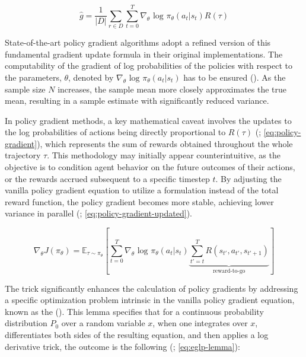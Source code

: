         \begin{equation}
            \hat{g} = \frac{1}{|D|} \sum_{r \in D} \sum_{t=0}^{T} \nabla_{\theta} \text{ log } \pi_{\theta}(a_t | s_t) R(\tau)
            \label{eq:policy-gradient-sample}
        \end{equation}
        
        \noindent State-of-the-art policy gradient algorithms adopt a refined version of this fundamental gradient update formula in their original implementations. The computability of the gradient of log probabilities of the policies with respect to the parameters, $\theta$, denoted by $\nabla_{\theta} \text{ log } \pi_{\theta}(a_t | s_t)$ has to be ensured (\textcolor{deepblue}{\cite{SpinningUp2018}}). As the sample size $N$ increases, the sample mean more closely approximates the true mean, resulting in a sample estimate with significantly reduced variance.
        
        \bigskip
        
        
        \noindent In policy gradient methods, a key mathematical caveat involves the updates to the log probabilities of actions being directly proportional to $R(\tau)$ (\textcolor{deepblue}{\cite{SpinningUp2018}; \autoref{eq:policy-gradient}}), which represents the sum of rewards obtained throughout the whole trajectory $\tau$. This methodology may initially appear counterintuitive, as the objective is to condition agent behavior on the future outcomes of their actions, or the rewards accrued subsequent to a specific timestep $t$. By adjusting the vanilla policy gradient equation to utilize a  formulation instead of the total reward function, the policy gradient becomes more stable, achieving lower variance in parallel (\textcolor{deepblue}{\cite{SpinningUp2018}; \autoref{eq:policy-gradient-updated}}).
        
        \begin{equation}
            \nabla_{\theta}J(\pi_{\theta}) = \mathbb{E}_{\tau \sim \pi_{\theta}} \left[ \sum_{t=0}^{T} \nabla_{\theta} \text{ log } \pi_{\theta}(a_t | s_t) \underbrace{\sum_{t'= t}^{T} R(s_{t'}, a_{t'}, s_{t'+1})}_{\text{reward-to-go}} \right]
            \label{eq:policy-gradient-updated}
        \end{equation}
        
        \noindent The  trick significantly enhances the calculation of policy gradients by addressing a specific optimization problem intrinsic in the vanilla policy gradient equation, known as the  (\textcolor{deepblue}{\cite{SpinningUp2018}}). This lemma specifies that for a continuous probability distribution $P_0$ over a random variable $x$, when one integrates over $x$, differentiates both sides of the resulting equation, and then applies a log derivative trick, the outcome is the following (\textcolor{deepblue}{\cite{SpinningUp2018}; \autoref{eq:eglp-lemma}}):
        
